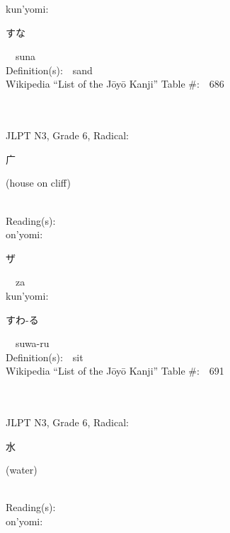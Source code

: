 \begin{multicols}{2}
{\hspace*{1em}}kun'yomi:\ \ \\
{\hspace*{2em}}{\begin{CJK}{UTF8}{min} すな \end{CJK}}\ \ suna\ \ \\
Definition(s):\ \ sand \\
Wikipedia ``List of the J\=oy\=o Kanji'' Table \#:\ \ 686 \\
\ \ \\
{\fontsize{34pt}{40pt}  }\ \ \\  %
{JLPT N3, Grade 6, Radical:\ \ {\begin{CJK}{UTF8}{min} 广 \end{CJK}} (house on cliff) } \\
Reading(s):\ \ \\
{\hspace*{1em}}on'yomi:\ \ \\
{\hspace*{2em}}{\begin{CJK}{UTF8}{min} ザ \end{CJK}}\ \ za\ \ \\
{\hspace*{1em}}kun'yomi:\ \ \\
{\hspace*{2em}}{\begin{CJK}{UTF8}{min} すわ-る \end{CJK}}\ \ suwa-ru\ \ \\
Definition(s):\ \ sit \\
Wikipedia ``List of the J\=oy\=o Kanji'' Table \#:\ \ 691 \\
\ \ \\
{\fontsize{34pt}{40pt}  }\ \ \\  %
{JLPT N3, Grade 6, Radical:\ \ {\begin{CJK}{UTF8}{min} 水 \end{CJK}} (water) } \\
Reading(s):\ \ \\
{\hspace*{1em}}on'yomi:\ \ \\

\end{multicols}

